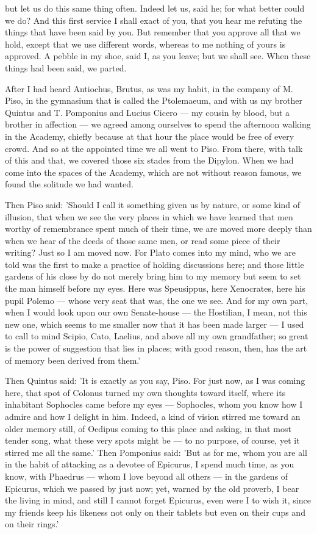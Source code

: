  but let us do this same thing often. Indeed let us, said he; for what better could we do? And this first service I shall exact of you, that you hear me refuting the things that have been said by you. But remember that you approve all that we hold, except that we use different words, whereas to me nothing of yours is approved. A pebble in my shoe, said I, as you leave; but we shall see. When these things had been said, we parted.


 After I had heard Antiochus, Brutus, as was my habit, in the company of M. Piso, in the gymnasium that is called the Ptolemaeum, and with us my brother Quintus and T. Pomponius and Lucius Cicero — my cousin by blood, but a brother in affection — we agreed among ourselves to spend the afternoon walking in the Academy, chiefly because at that hour the place would be free of every crowd. And so at the appointed time we all went to Piso. From there, with talk of this and that, we covered those six stades from the Dipylon. When we had come into the spaces of the Academy, which are not without reason famous, we found the solitude we had wanted.

 Then Piso said: 'Should I call it something given us by nature, or some kind of illusion, that when we see the very places in which we have learned that men worthy of remembrance spent much of their time, we are moved more deeply than when we hear of the deeds of those same men, or read some piece of their writing? Just so I am moved now. For Plato comes into my mind, who we are told was the first to make a practice of holding discussions here; and those little gardens of his close by do not merely bring him to my memory but seem to set the man himself before my eyes. Here was Speusippus, here Xenocrates, here his pupil Polemo — whose very seat that was, the one we see. And for my own part, when I would look upon our own Senate-house — the Hostilian, I mean, not this new one, which seems to me smaller now that it has been made larger — I used to call to mind Scipio, Cato, Laelius, and above all my own grandfather; so great is the power of suggestion that lies in places; with good reason, then, has the art of memory been derived from them.'

 Then Quintus said: 'It is exactly as you say, Piso. For just now, as I was coming here, that spot of Colonus turned my own thoughts toward itself, where its inhabitant Sophocles came before my eyes — Sophocles, whom you know how I admire and how I delight in him. Indeed, a kind of vision stirred me toward an older memory still, of Oedipus coming to this place and asking, in that most tender song, what these very spots might be — to no purpose, of course, yet it stirred me all the same.' Then Pomponius said: 'But as for me, whom you are all in the habit of attacking as a devotee of Epicurus, I spend much time, as you know, with Phaedrus — whom I love beyond all others — in the gardens of Epicurus, which we passed by just now; yet, warned by the old proverb, I bear the living in mind, and still I cannot forget Epicurus, even were I to wish it, since my friends keep his likeness not only on their tablets but even on their cups and on their rings.'

